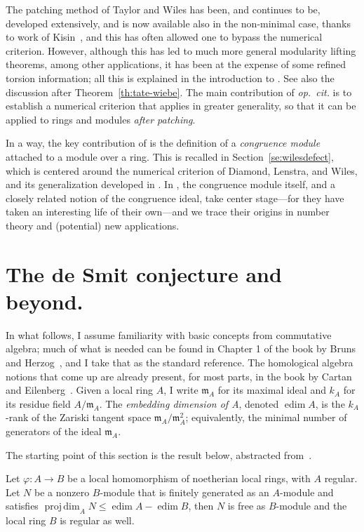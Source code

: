 \documentclass[twoside,leqno]{article}
\newcommand{\edim}{\operatorname{edim}}
\newcommand{\fm}{{\mathfrak m}}
\newcommand{\pdim}{\operatorname{proj\,dim}}
\begin{document}
The patching method of Taylor and Wiles has been, and continues to be, developed extensively, and is now available also in the non-minimal case, thanks to work of Kisin~\cite{Kisin:2009a}, and this has often allowed one to bypass the numerical criterion. However, although this has led to much more general modularity lifting theorems, among other applications, it has been at the expense of some refined torsion information; all this is explained in the introduction to \cite{Iyengar/Khare/Manning:2024a}. See also the discussion after Theorem~\ref{th:tate-wiebe}. The main contribution of \emph{op.~cit.} is to establish a numerical criterion that applies in greater generality, so that it can be applied to rings and modules \emph{after patching}. 

In a way, the key contribution of \cite{Iyengar/Khare/Manning:2024a} is the definition of a \emph{congruence module} attached to a module over a ring. This is recalled in Section~\ref{se:wilesdefect}, which is centered around  the numerical criterion of Diamond, Lenstra, and Wiles, and its generalization developed in \cite{Iyengar/Khare/Manning:2024a, Iyengar/Khare/Manning/Urban:2024}. In \cite{Iyengar/Khare/Manning:2025a},  the congruence module itself, and a closely related notion of the congruence ideal, take center stage---for they have taken an interesting life of their own---and we trace their origins in number theory and (potential) new applications.

\section{The de Smit conjecture and beyond.}
\label{se:desmit}
In what follows, I  assume familiarity with basic concepts from commutative algebra; much of what is needed can be found in Chapter 1 of the book by Bruns and Herzog~\cite{Bruns/Herzog:1998a}, and I take that  as the standard reference. The homological algebra notions that come up are already present, for most parts, in the book by Cartan and Eilenberg~\cite{Cartan/Eilenberg:1956a}. Given a local ring $A$, I write $\fm_A$ for its maximal ideal and $k_A$ for its residue field $A/\fm_A$. The \emph{embedding dimension of A}, denoted $\edim A$, is the $k_A$-rank of the Zariski tangent space $\fm_A/\fm_A^2$; equivalently, the minimal number of generators of the ideal $\fm_A$.

 The starting point of this section is the result below, abstracted from~\cite[Section~2]{Diamond:1997}. 

\begin{proposition}
\label{pr:diamond}
Let $\varphi\colon A\to B$ be a local homomorphism of noetherian local rings, with $A$ regular. Let $N$ be a nonzero $B$-module that is finitely generated as an $A$-module and satisfies $\pdim_AN\le \edim A-\edim B$, then $N$ is free as $B$-module and the local ring $B$ is regular as well.
\end{proposition}
\end{document}
